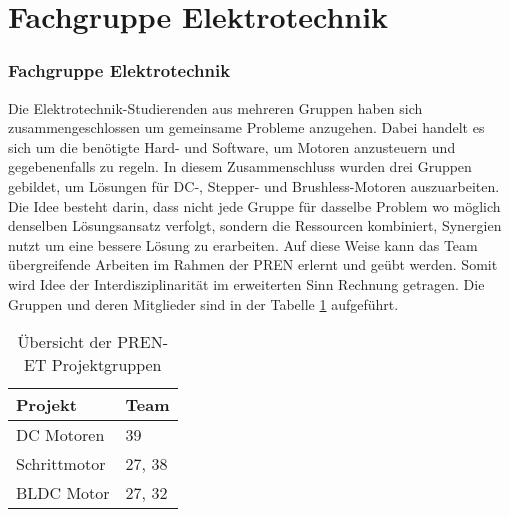 \ifSTANDALONE
\section{Fachgruppe Elektrotechnik}
\fi
\ifEMBED
\subsubsection{Fachgruppe Elektrotechnik}
\label{chap:Fachgruppe Elektrotechnik}
\fi
Die Elektrotechnik-Studierenden aus mehreren Gruppen haben sich
zusammengeschlossen um gemeinsame Probleme anzugehen. Dabei handelt es sich
um die benötigte Hard- und Software, um Motoren anzusteuern
und gegebenenfalls zu regeln. In diesem Zusammenschluss wurden drei Gruppen
gebildet, um Lösungen für DC-, Stepper- und Brushless-Motoren auszuarbeiten.
Die Idee besteht darin, dass nicht jede Gruppe für dasselbe Problem wo
möglich denselben Lösungsansatz verfolgt, sondern die Ressourcen kombiniert,
Synergien nutzt um eine bessere Lösung zu erarbeiten. Auf diese Weise kann
das Team übergreifende Arbeiten im Rahmen der PREN erlernt und
geübt werden. Somit wird Idee der Interdisziplinarität im erweiterten Sinn
Rechnung getragen. Die Gruppen und deren Mitglieder sind in der Tabelle 
\ref{tab:pren-et-overview} aufgeführt.
\begin{table}[h!]
	\centering
	\begin{tabular}{l l}
		Projekt		& Team \\
		\hline
		DC Motoren	& 39 \\
		Schrittmotor	& 27, 38 \\
		BLDC Motor	& 27, 32 \\
	\end{tabular}
	\caption{Übersicht der PREN-ET Projektgruppen}
	\label{tab:pren-et-overview}
\end{table}
